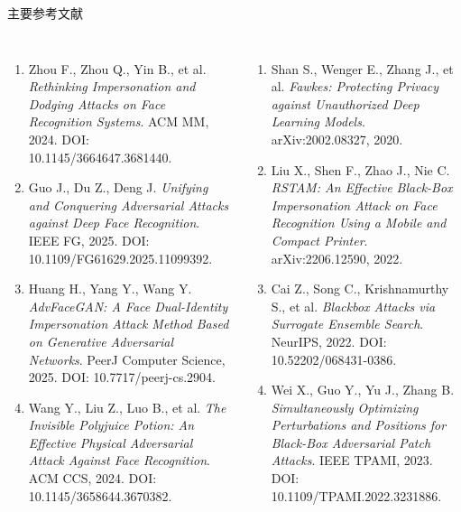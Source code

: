 \begin{frame}{主要参考文献}
  \vspace{-2em}
  \tiny
  \begin{columns}[T,onlytextwidth]
    \begin{enumerate}\setlength{\itemsep}{3pt}
      \item Zhou F., Zhou Q., Yin B., et al.
        \emph{Rethinking Impersonation and Dodging Attacks on Face Recognition Systems}.
        ACM MM, 2024. DOI: 10.1145/3664647.3681440.

      \item Guo J., Du Z., Deng J.
        \emph{Unifying and Conquering Adversarial Attacks against Deep Face Recognition}.
        IEEE FG, 2025. DOI: 10.1109/FG61629.2025.11099392.

      \item Huang H., Yang Y., Wang Y.
        \emph{AdvFaceGAN: A Face Dual-Identity Impersonation Attack Method Based on Generative Adversarial Networks}.
        PeerJ Computer Science, 2025. DOI: 10.7717/peerj-cs.2904.

      \item Wang Y., Liu Z., Luo B., et al.
        \emph{The Invisible Polyjuice Potion: An Effective Physical Adversarial Attack Against Face Recognition}.
        ACM CCS, 2024. DOI: 10.1145/3658644.3670382.
    \end{enumerate}

    \begin{enumerate}\setlength{\itemsep}{3pt}
      \setcounter{enumi}{4}
      \item Shan S., Wenger E., Zhang J., et al.
        \emph{Fawkes: Protecting Privacy against Unauthorized Deep Learning Models}.
        arXiv:2002.08327, 2020.

      \item Liu X., Shen F., Zhao J., Nie C.
        \emph{RSTAM: An Effective Black-Box Impersonation Attack on Face Recognition Using a Mobile and Compact Printer}.
        arXiv:2206.12590, 2022.

      \item Cai Z., Song C., Krishnamurthy S., et al.
        \emph{Blackbox Attacks via Surrogate Ensemble Search}.
        NeurIPS, 2022. DOI: 10.52202/068431-0386.

      \item Wei X., Guo Y., Yu J., Zhang B.
        \emph{Simultaneously Optimizing Perturbations and Positions for Black-Box Adversarial Patch Attacks}.
        IEEE TPAMI, 2023. DOI: 10.1109/TPAMI.2022.3231886.
    \end{enumerate}
  \end{columns}
\end{frame}

